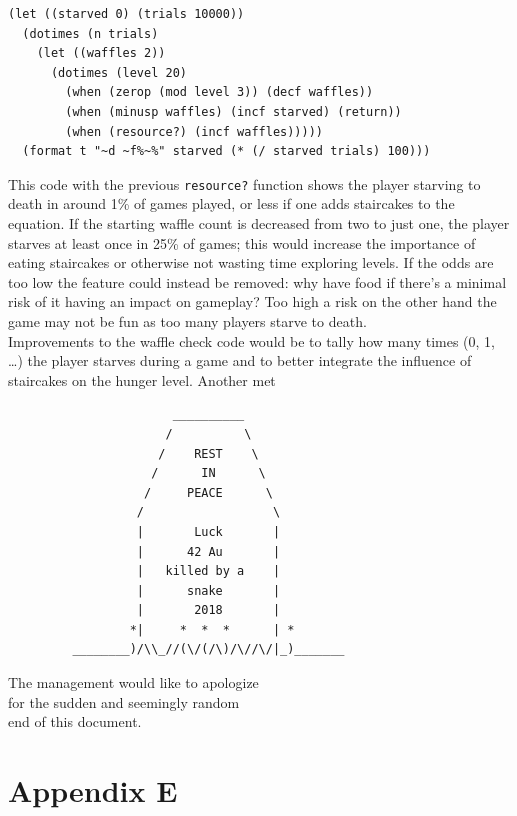 \documentclass[12pt,a4paper]{article}
\begin{document}
\begin{verbatim}
(let ((starved 0) (trials 10000))
  (dotimes (n trials)
    (let ((waffles 2))
      (dotimes (level 20)
        (when (zerop (mod level 3)) (decf waffles))
        (when (minusp waffles) (incf starved) (return))
        (when (resource?) (incf waffles)))))
  (format t "~d ~f%~%" starved (* (/ starved trials) 100)))
\end{verbatim}

This code with the previous \texttt{resource?} function shows the player
starving to death in around 1\% of games played, or less if one adds
staircakes to the equation. If the starting waffle count is decreased
from two to just one, the player starves at least once in 25\% of games;
this would increase the importance of eating staircakes or otherwise not
wasting time exploring levels. If the odds are too low the feature could
instead be removed: why have food if there's a minimal risk of it having
an impact on gameplay? Too high a risk on the other hand the game may
not be fun as too many players starve to death. \\

Improvements to the waffle check code would be to tally how many times
(0, 1, \ldots) the player starves during a game and to better integrate
the influence of staircakes on the hunger level. Another met
\vspace{-2.2em}
\begin{verbatim}
                       __________
                      /          \
                     /    REST    \
                    /      IN      \
                   /     PEACE      \
                  /                  \
                  |       Luck       |
                  |      42 Au       |
                  |   killed by a    |
                  |      snake       |
                  |       2018       |
                 *|     *  *  *      | *
         ________)/\\_//(\/(/\)/\//\/|_)_______
\end{verbatim}
\clearpage
\begin{center}
The management would like to apologize\\
for the sudden and seemingly random\\
end of this document.
\end{center}
\clearpage

\section*{Appendix E}
\end{document}
